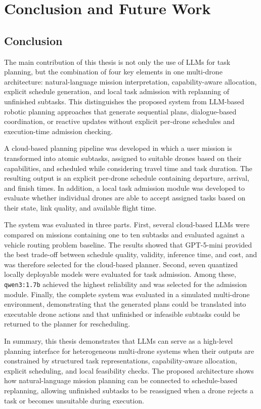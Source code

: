 \chapter{Conclusion and Future Work}

\section{Conclusion}
The main contribution of this thesis is not only the use of LLMs for task planning, but the
combination of four key elements in one multi-drone architecture: natural-language mission
interpretation, capability-aware allocation, explicit schedule generation, and local task admission
with replanning of unfinished subtasks. This distinguishes the proposed system from LLM-based
robotic planning approaches that generate sequential plans, dialogue-based coordination, or
reactive updates without explicit per-drone schedules and execution-time admission checking.

A cloud-based planning pipeline was developed in which a user mission is transformed into atomic subtasks,
assigned to suitable drones based on their capabilities, and scheduled while considering travel time and task duration.
The resulting output is an explicit per-drone schedule containing departure, arrival, and finish times.
In addition, a local task admission module was developed to evaluate whether individual drones are able to accept assigned
tasks based on their state, link quality, and available flight time.

The system was evaluated in three parts.
First, several cloud-based LLMs were compared on missions containing one to ten subtasks and evaluated against a
vehicle routing problem baseline. The results showed that GPT-5-mini provided the best trade-off between schedule
quality, validity, inference time, and cost, and was therefore selected for the cloud-based planner. Second, seven
quantized locally deployable models were evaluated for task admission. Among these, \texttt{qwen3:1.7b} achieved the
highest reliability and was selected for the admission module. Finally, the complete system was evaluated in a simulated
multi-drone environment, demonstrating that the generated plans could be translated into executable drone actions and
that unfinished or infeasible subtasks could be returned to the planner for rescheduling.

In summary, this thesis demonstrates that LLMs can serve as a high-level planning interface for
heterogeneous multi-drone systems when their outputs are constrained by structured task
representations, capability-aware allocation, explicit scheduling, and local feasibility checks.
The proposed architecture shows how natural-language mission planning can be connected to
schedule-based replanning, allowing unfinished subtasks to be reassigned when a drone rejects a
task or becomes unsuitable during execution.

